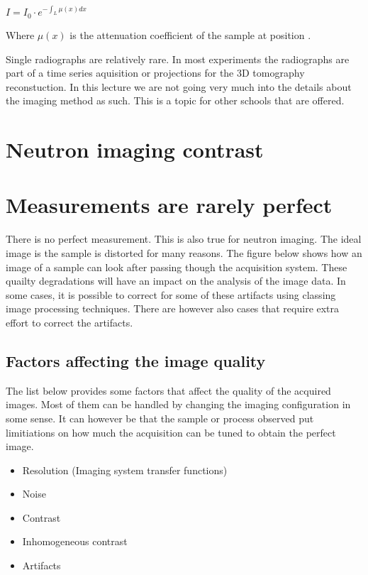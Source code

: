 \documentclass[letterpaper,10pt,english]{sphinxmanual}
\begin{document}
\(I=I_0\cdot{}e^{-\int_L \mu{}(x) dx}\)

Where \(\mu(x)\) is the attenuation coefficient of the sample at position .

Single radiographs are relatively rare. In most experiments the radiographs are part of a time series aquisition or projections for the 3D tomography reconstuction. In this lecture we are not going very much into the details about the imaging method as such. This is a topic for other schools that are offered.


\section{Neutron imaging contrast}
\label{\detokenize{ML4NeutronImageSegmentation:neutron-imaging-contrast}}

\section{Measurements are rarely perfect}
\label{\detokenize{ML4NeutronImageSegmentation:measurements-are-rarely-perfect}}


There is no perfect measurement. This is also true for neutron imaging. The ideal image is the sample is distorted for many reasons. The figure below shows how an image of a sample can look after passing though the acquisition system. These quailty degradations will have an impact on the analysis of the image data. In some cases, it is possible to correct for some of these artifacts using classing image processing techniques. There are however also cases that require extra effort to correct the artifacts.


\subsection{Factors affecting the image quality}
\label{\detokenize{ML4NeutronImageSegmentation:factors-affecting-the-image-quality}}
The list below provides some factors that affect the quality of the acquired images. Most of them can be handled by changing the imaging configuration in some sense. It can however be that the sample or process observed put limitiations on how much the acquisition can be tuned to obtain the perfect image.
\begin{itemize}
\item {} 
Resolution (Imaging system transfer functions)

\item {} 
Noise

\item {} 
Contrast

\item {} 
Inhomogeneous contrast

\item {} 
Artifacts

\end{itemize}
\end{document}
